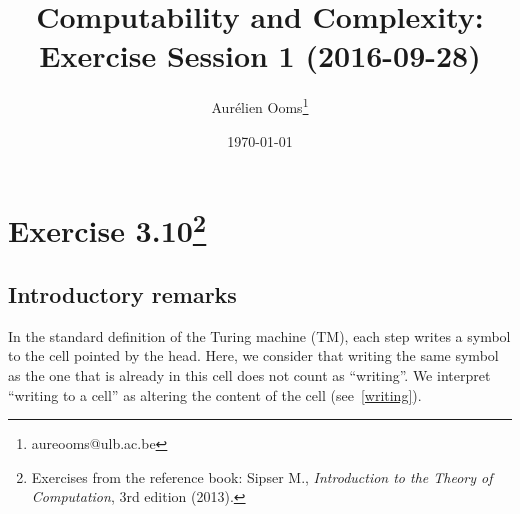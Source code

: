 \documentclass{article}
\title{Computability and Complexity:\\Exercise Session 1 (2016-09-28)}
\author{Aurélien Ooms\footnote{aureooms@ulb.ac.be}}
\date{\today}
\newcommand{\0}{\texttt{\textvisiblespace}}
\newcommand{\°}{\obullet{\0}}
\newcommand{\TM}{TM}
\begin{document}
\maketitle
\tableofcontents

\section{Exercise 3.10\footnote{Exercises from the reference book: Sipser M.,
\emph{Introduction to the Theory of Computation}, 3rd edition (2013).}}

\subsection{Introductory remarks}
In the standard definition of the Turing machine (\TM{}), each step writes a symbol to
the cell pointed by the head. Here, we consider that writing the same symbol as
the one that is already in this cell does not count as ``writing''. We
interpret ``writing to a cell'' as altering the content of the cell
(see~\ref{writing}).
\end{document}

